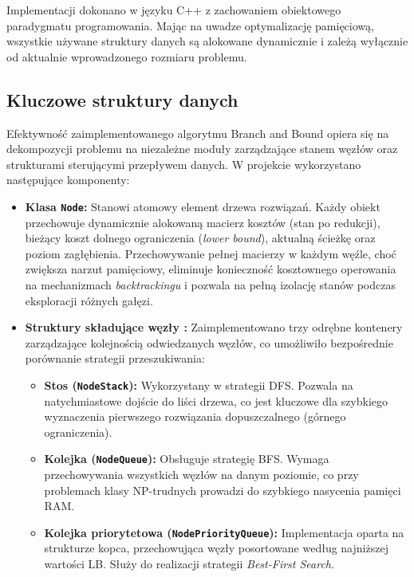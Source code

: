 \documentclass[12pt, a4paper]{article}
\begin{document}
	Implementacji dokonano w języku C++ z zachowaniem obiektowego paradygmatu programowania. Mając na uwadze optymalizację pamięciową, wszystkie używane struktury danych są alokowane dynamicznie i zależą wyłącznie od aktualnie wprowadzonego rozmiaru problemu.
	
\subsection{Kluczowe struktury danych}

Efektywność zaimplementowanego algorytmu Branch and Bound opiera się na dekompozycji problemu na niezależne moduły zarządzające stanem węzłów oraz strukturami sterującymi przepływem danych. W projekcie wykorzystano następujące komponenty:

\begin{itemize}
	\item \textbf{Klasa \texttt{Node}:} Stanowi atomowy element drzewa rozwiązań. Każdy obiekt przechowuje dynamicznie alokowaną macierz kosztów (stan po redukcji), bieżący koszt dolnego ograniczenia (\textit{lower bound}), aktualną ścieżkę oraz poziom zagłębienia. Przechowywanie pełnej macierzy w każdym węźle, choć zwiększa narzut pamięciowy, eliminuje konieczność kosztownego operowania na mechanizmach \textit{backtrackingu} i pozwala na pełną izolację stanów podczas eksploracji różnych gałęzi.
	
	\item \textbf{Struktury składujące węzły :} 
	Zaimplementowano trzy odrębne kontenery zarządzające kolejnością odwiedzanych węzłów, co umożliwiło bezpośrednie porównanie strategii przeszukiwania:
	\begin{itemize}
		\item \textbf{Stos (\texttt{NodeStack}):} Wykorzystany w strategii DFS. Pozwala na natychmiastowe dojście do liści drzewa, co jest kluczowe dla szybkiego wyznaczenia pierwszego rozwiązania dopuszczalnego (górnego ograniczenia).
		\item \textbf{Kolejka (\texttt{NodeQueue}):} Obsługuje strategię BFS. Wymaga przechowywania wszystkich węzłów na danym poziomie, co przy problemach klasy NP-trudnych prowadzi do szybkiego nasycenia pamięci RAM.
		\item \textbf{Kolejka priorytetowa (\texttt{NodePriorityQueue}):} Implementacja oparta na strukturze kopca, przechowująca węzły posortowane według najniższej wartości LB. Służy do realizacji strategii \textit{Best-First Search}.
	\end{itemize}
	

\end{itemize}
\end{document}
